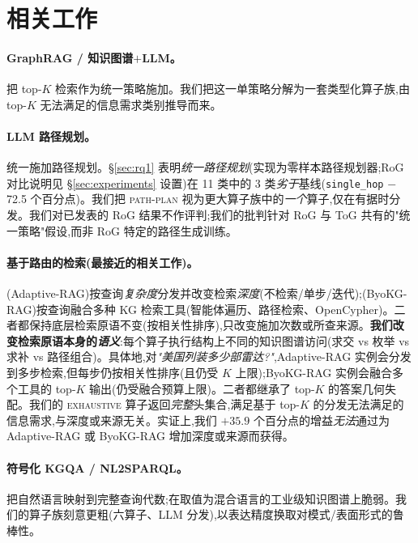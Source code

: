 \documentclass[11pt,a4paper]{article}
\newcommand{\qtype}[1]{\texttt{\small #1}}
\newcommand{\op}[1]{\textsc{\small #1}}
\begin{document}
\section{相关工作}
\label{sec:related}

\paragraph{GraphRAG / 知识图谱\texorpdfstring{$+$}{+}LLM。} \citet{edge2024graphrag,gutierrez2024hipporag,wang2024kgp,wen2024mindmap} 把 top-$K$ 检索作为统一策略施加。我们把这一单策略分解为一套类型化算子族,由 top-$K$ 无法满足的信息需求类别推导而来。

\paragraph{LLM 路径规划。} \citet{luo2024rog,sun2024tog,ma2025tog2} 统一施加路径规划。\S\ref{sec:rq1} 表明\emph{统一路径规划}(实现为零样本路径规划器;RoG 对比说明见 \S\ref{sec:experiments} 设置)在 11 类中的 3 类\emph{劣于}基线(\qtype{single\_hop} $-$72.5 个百分点)。我们把 \op{path-plan} 视为更大算子族中的\emph{一个}算子,仅在有据时分发。我们对已发表的 RoG 结果不作评判;我们的批判针对 RoG 与 ToG 共有的"统一策略"假设,而非 RoG 特定的路径生成训练。

\paragraph{基于路由的检索(最接近的相关工作)。} \citet{jeong2024adaptiverag}(Adaptive-RAG)按查询\emph{复杂度}分发并改变检索\emph{深度}(不检索/单步/迭代);\citet{byokgrag2025}(ByoKG-RAG)按查询融合多种 KG 检索工具(智能体遍历、路径检索、OpenCypher)。二者都保持底层检索原语不变(按相关性排序),只改变施加次数或所查来源。\textbf{我们改变检索原语本身的\emph{语义}}:每个算子执行结构上不同的知识图谱访问(求交 vs 枚举 vs 求补 vs 路径组合)。具体地,对\emph{"美国列装多少部雷达?"},Adaptive-RAG 实例会分发到多步检索,但每步仍按相关性排序(且仍受 $K$ 上限);ByoKG-RAG 实例会融合多个工具的 top-$K$ 输出(仍受融合预算上限)。二者都继承了 top-$K$ 的答案几何失配。我们的 \op{exhaustive} 算子返回\emph{完整}头集合,满足基于 top-$K$ 的分发无法满足的信息需求,与深度或来源无关。实证上,我们 $+35.9$ 个百分点的增益\emph{无法}通过为 Adaptive-RAG 或 ByoKG-RAG 增加深度或来源而获得。

\paragraph{符号化 KGQA / NL2SPARQL。} \citet{jiang2023structgpt,baek2023kaping} 把自然语言映射到完整查询代数;在取值为混合语言的工业级知识图谱上脆弱。我们的算子族刻意更粗(六算子、LLM 分发),以表达精度换取对模式/表面形式的鲁棒性。
\end{document}
